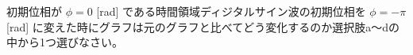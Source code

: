 初期位相が $\phi = 0$ [rad] である時間領域ディジタルサイン波の初期位相を $\phi = -\pi$ [rad] に変えた時にグラフは元のグラフと比べてどう変化するのか選択肢a〜dの中から1つ選びなさい。
